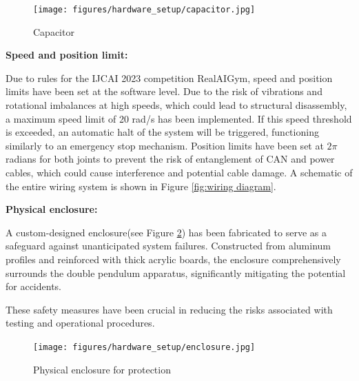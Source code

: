 \begin{figure}[H]
    \centering
    \texttt{[image: figures/hardware\_setup/capacitor.jpg]}
    \caption{Capacitor}
    \label{fig:capacitor}
\end{figure}

\textbf{Speed and position limit:}

Due to rules for the IJCAI 2023 competition RealAIGym\cite{dfki_ric_underactuated_lab_2023}, speed and position limits have been set at the software level. Due to the risk of vibrations and rotational imbalances at high speeds, which could lead to structural disassembly, a maximum speed limit of 20 rad/s has been implemented. If this speed threshold is exceeded, an automatic halt of the system will be triggered, functioning similarly to an emergency stop mechanism. Position limits have been set at \(2\pi\) radians for both joints to prevent the risk of entanglement of CAN and power cables, which could cause interference and potential cable damage. A schematic of the entire wiring system is shown in Figure \ref{fig:wiring diagram}.

\textbf{Physical enclosure:}

A custom-designed enclosure(see Figure \ref{fig:overview_experiment_setup}) has been fabricated to serve as a safeguard against unanticipated system failures. Constructed from aluminum profiles and reinforced with thick acrylic boards, the enclosure comprehensively surrounds the double pendulum apparatus, significantly mitigating the potential for accidents.

These safety measures have been crucial in reducing the risks associated with testing and operational procedures.

\begin{figure}[H]
    \centering
    \texttt{[image: figures/hardware\_setup/enclosure.jpg]}
    \caption{Physical enclosure for protection}
    \label{fig:overview_experiment_setup}
\end{figure}


